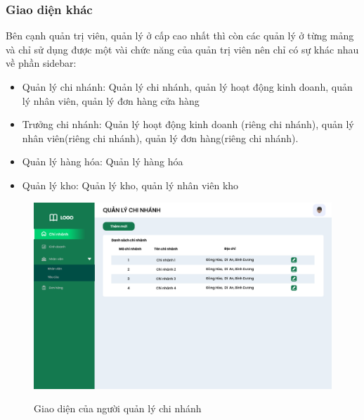     \subsubsection{Giao diện khác}
        Bên cạnh quản trị viên, quản lý ở cấp cao nhất thì còn các quản lý ở từng mảng và chỉ sử dụng được một vài chức năng của quản trị viên nên chỉ có sự khác nhau về phần sidebar:
        \begin{itemize}
            \item Quản lý chi nhánh: Quản lý chi nhánh, quản lý hoạt động kinh doanh, quản lý nhân viên, quản lý đơn hàng cửa hàng
            \item Trưởng chi nhánh: Quản lý hoạt động kinh doanh (riêng chi nhánh), quản lý nhân viên(riêng chi nhánh), quản lý đơn hàng(riêng chi nhánh).
            \item Quản lý hàng hóa: Quản lý hàng hóa
            \item Quản lý kho: Quản lý kho, quản lý nhân viên kho
        \end{itemize}
            \begin{figure}[!htp]
                \centering
                \includegraphics[width=12cm]{img/UI/admin/sub-admin. Quản lý chi nhánh.png}
                \label{44}
                \newline
                \caption{Giao diện của người quản lý chi nhánh}
            \end{figure}
        
